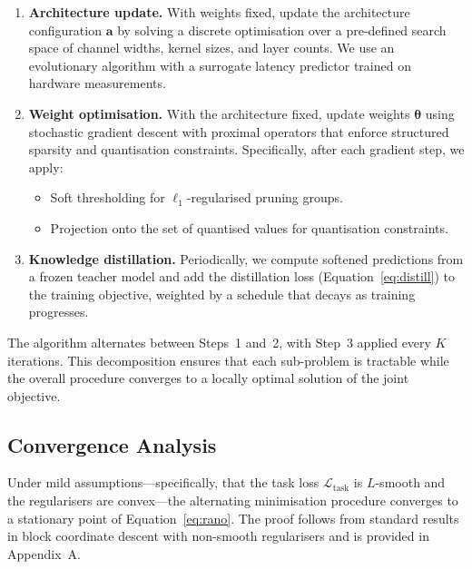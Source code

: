 \begin{enumerate}[label=\textbf{Step \arabic*},leftmargin=2.5em]
  \item \textbf{Architecture update.} With weights fixed, update the
  architecture configuration $\mathbf{a}$ by solving a discrete
  optimisation over a pre-defined search space of channel widths, kernel
  sizes, and layer counts. We use an evolutionary algorithm with a
  surrogate latency predictor trained on hardware measurements.

  \item \textbf{Weight optimisation.} With the architecture fixed,
  update weights $\boldsymbol{\theta}$ using stochastic gradient descent
  with proximal operators that enforce structured sparsity and
  quantisation constraints. Specifically, after each gradient step, we
  apply:
  \begin{itemize}
    \item Soft thresholding for $\ell_1$-regularised pruning groups.
    \item Projection onto the set of quantised values for quantisation
    constraints.
  \end{itemize}

  \item \textbf{Knowledge distillation.} Periodically, we compute
  softened predictions from a frozen teacher model and add the
  distillation loss (Equation~\ref{eq:distill}) to the training
  objective, weighted by a schedule that decays as training progresses.
\end{enumerate}

The algorithm alternates between Steps~1 and~2, with Step~3 applied
every $K$ iterations. This decomposition ensures that each sub-problem
is tractable while the overall procedure converges to a locally optimal
solution of the joint objective.

\subsection{Convergence Analysis}

Under mild assumptions---specifically, that the task loss
$\mathcal{L}_{\text{task}}$ is $L$-smooth and the regularisers are
convex---the alternating minimisation procedure converges to a
stationary point of Equation~\ref{eq:rano}. The proof follows from
standard results in block coordinate descent with non-smooth
regularisers and is provided in Appendix~A.
